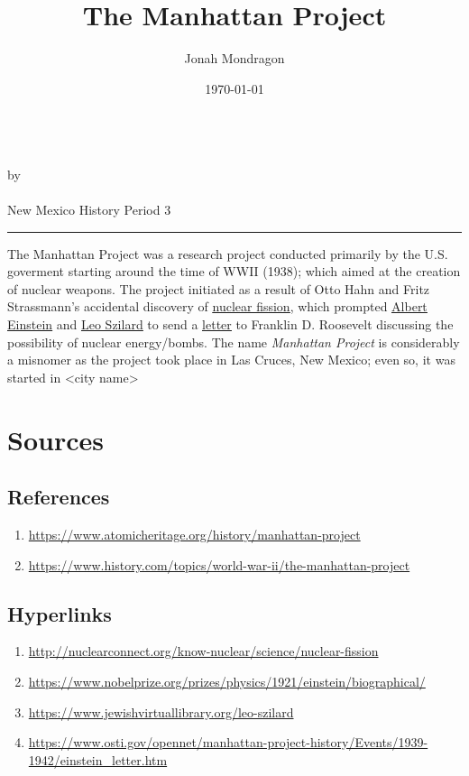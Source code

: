 \documentclass[12pt]{article}
\newcommand{\PutTitle}[1]
{
    \begin{center}
        {\huge\bfseries\thetitle}\\
        by \theauthor\\
        \thedate\\
        #1
    \end{center}
    \hrule
    \vspace{2ex}
}
\begin{document}
\title{The Manhattan Project}
\author{Jonah Mondragon}
\date{\today}
\PutTitle{New Mexico History Period 3}

\pagestyle{headings}
\thispagestyle{empty}
\doublespacing

The Manhattan Project was a research project conducted primarily by the U.S. goverment starting around the time of WWII (1938); which aimed at the creation of nuclear weapons.
The project initiated as a result of Otto Hahn and Fritz Strassmann's accidental discovery of {\color{blue}\underline{\href{http://nuclearconnect.org/know-nuclear/science/nuclear-fission}{nuclear fission}}},
    which prompted {\color{blue}\underline{\href{https://www.nobelprize.org/prizes/physics/1921/einstein/biographical/}{Albert Einstein}}} and {\color{blue}\underline{\href{https://www.jewishvirtuallibrary.org/leo-szilard}{Leo Szilard}}} to send a 
    {\color{blue}\underline{\href{https://www.osti.gov/opennet/manhattan-project-history/Events/1939-1942/einstein_letter.htm}{letter}}} to Franklin D. Roosevelt discussing the possibility of nuclear energy/bombs.
The name \textit{Manhattan Project} is considerably a misnomer as the project took place in Las Cruces, New Mexico; even so, it was started in <city name>

\newpage

\section*{Sources}
\subsection*{References}
\begin{enumerate}
    \item{\url{https://www.atomicheritage.org/history/manhattan-project}}
    \item{\url{https://www.history.com/topics/world-war-ii/the-manhattan-project}}
\end{enumerate}

\subsection*{Hyperlinks}
\begin{enumerate}
    \item{\url{http://nuclearconnect.org/know-nuclear/science/nuclear-fission}}
    \item{\url{https://www.nobelprize.org/prizes/physics/1921/einstein/biographical/}}
    \item{\url{https://www.jewishvirtuallibrary.org/leo-szilard}}
    \item{\url{https://www.osti.gov/opennet/manhattan-project-history/Events/1939-1942/einstein_letter.htm}}
\end{enumerate}
\end{document}
